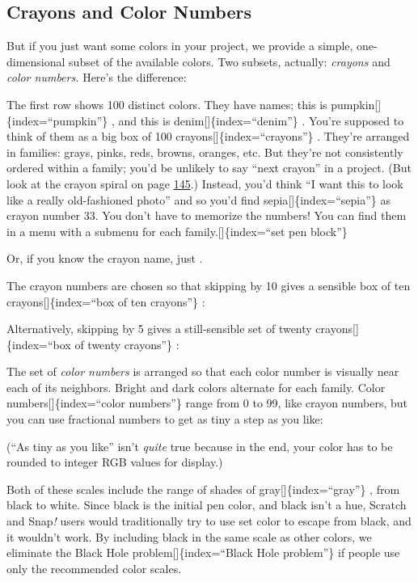 \documentclass[
  letterpaper,
]{book}
\begin{document}
\subsection{Crayons and Color Numbers}\label{crayons-and-color-numbers}

But if you just want some colors in your project, we provide a simple,
one-dimensional subset of the available colors. Two subsets, actually:
\emph{crayons} and \emph{color numbers.} Here's the difference:

The first row shows 100 distinct colors. They have names; this is
pumpkin{[}{]}\{index=``pumpkin''\} , and this is
denim{[}{]}\{index=``denim''\} . You're supposed to think of them as a
big box of 100 crayons{[}{]}\{index=``crayons''\} . They're arranged in
families: grays, pinks, reds, browns, oranges, etc. But they're not
consistently ordered within a family; you'd be unlikely to say ``next
crayon'' in a project. (But look at the crayon spiral on page
\hyperref[spirals]{145}.) Instead, you'd think ``I want this to look
like a really old-fashioned photo'' and so you'd find
sepia{[}{]}\{index=``sepia''\} as crayon number 33. You don't have to
memorize the numbers! You can find them in a menu with a submenu for
each family.{[}{]}\{index=``set pen block''\}

Or, if you know the crayon name, just .

The crayon numbers are chosen so that skipping by 10 gives a sensible
box of ten crayons{[}{]}\{index=``box of ten crayons''\} :

Alternatively, skipping by 5 gives a still-sensible set of twenty
crayons{[}{]}\{index=``box of twenty crayons''\} :

The set of \emph{color numbers} is arranged so that each color number is
visually near each of its neighbors. Bright and dark colors alternate
for each family. Color numbers{[}{]}\{index=``color numbers''\} range
from 0 to 99, like crayon numbers, but you can use fractional numbers to
get as tiny a step as you like:

(``As tiny as you like'' isn't \emph{quite} true because in the end,
your color has to be rounded to integer RGB values for display.)

Both of these scales include the range of shades of
gray{[}{]}\{index=``gray''\} , from black to white. Since black is the
initial pen color, and black isn't a hue, Scratch and Snap\emph{!} users
would traditionally try to use set color to escape from black, and it
wouldn't work. By including black in the same scale as other colors, we
eliminate the Black Hole problem{[}{]}\{index=``Black Hole problem''\}
if people use only the recommended color scales.
\end{document}

